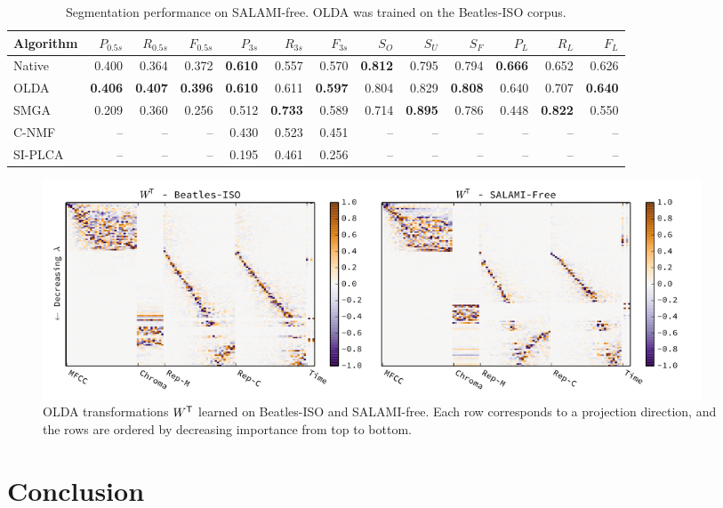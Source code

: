 \documentclass{article}
\begin{document}
\begin{table}[t]
\centering
\caption{Segmentation performance on SALAMI-free. OLDA was trained on the Beatles-ISO corpus.\label{tab:results:salami}}
\begin{tabular}{lrrrrrrrrrrrr}
\toprule%
Algorithm       &   $P_{0.5s}$ & $R_{0.5s}$ & $F_{0.5s}$ & $P_{3s}$     & $R_{3s}$   & $F_{3s}$   & $S_O$ & $S_U$ & $S_F$ & $P_L$& $R_L$& $F_L$\\
\hline
Native  & 0.400 & 0.364 & 0.372 & \textbf{0.610} & 0.557 & 0.570 & \textbf{0.812} & 0.795 & 0.794 & \textbf{0.666} & 0.652 & 0.626\\
OLDA    & \textbf{0.406} & \textbf{0.407} & \textbf{0.396} & \textbf{0.610} & 0.611 & \textbf{0.597} & 0.804 & 0.829 & \textbf{0.808} & 0.640 & 0.707 & \textbf{0.640}\\
\hline
SMGA~\hfill\cite{serra2012unsupervised}
        & 0.209 & 0.360 & 0.256 & 0.512 & \textbf{0.733} & 0.589 & 0.714 & \textbf{0.895} & 0.786 & 0.448 & \textbf{0.822} & 0.550\\
C-NMF~\hfill\cite{nieto2013convex}            
        & -- & -- & -- & 0.430 & 0.523 & 0.451 & -- & -- & -- & -- & -- & -- \\
SI-PLCA~\hfill\cite{weiss2011unsupervised}    
        & -- & -- & -- & 0.195 & 0.461 & 0.256 & -- & -- & -- & -- & -- & -- \\  
\bottomrule%
\end{tabular}
\end{table}

\begin{figure}[t]
\centering%
\includegraphics[width=0.95\textwidth]{figs/w}%
\caption{OLDA transformations $W^\mathsf{T}$ learned on Beatles-ISO and SALAMI-free. Each row corresponds to a projection
direction, and the rows are ordered by decreasing importance from top to bottom.\label{fig:w}}
\end{figure}

\section{Conclusion}
\label{sec:conclusion}




\end{document}
